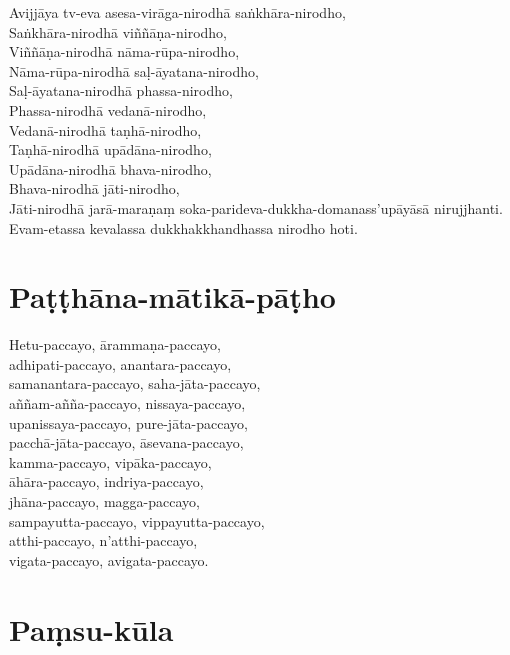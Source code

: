 Avijjāya tv-eva asesa-virāga-nirodhā saṅkhāra-nirodho,\\
Saṅkhāra-nirodhā viññāṇa-nirodho,\\
Viññāṇa-nirodhā nāma-rūpa-nirodho,\\
Nāma-rūpa-nirodhā saḷ-āyatana-nirodho,\\
Saḷ-āyatana-nirodhā phassa-nirodho,\\
Phassa-nirodhā vedanā-nirodho,\\
Vedanā-nirodhā taṇhā-nirodho,\\
Taṇhā-nirodhā upādāna-nirodho,\\
Upādāna-nirodhā bhava-nirodho,\\
Bhava-nirodhā jāti-nirodho,\\
Jāti-nirodhā jarā-maraṇaṃ soka-parideva-dukkha-domanass'upāyāsā nirujjhanti.\\
Evam-etassa kevalassa dukkhakkhandhassa nirodho hoti.


\section{Paṭṭhāna-mātikā-pāṭho}


Hetu-paccayo, ārammaṇa-paccayo,\\
adhipati-paccayo, anantara-paccayo,\\
samanantara-paccayo, saha-jāta-paccayo,\\
aññam-añña-paccayo, nissaya-paccayo,\\
upanissaya-paccayo, pure-jāta-paccayo,\\
pacchā-jāta-paccayo, āsevana-paccayo,\\
kamma-paccayo, vipāka-paccayo,\\
āhāra-paccayo, indriya-paccayo,\\
jhāna-paccayo, magga-paccayo,\\
sampayutta-paccayo, vippayutta-paccayo,\\
atthi-paccayo, n'atthi-paccayo,\\
vigata-paccayo, avigata-paccayo.


\clearpage

\section{Paṃsu-kūla}

